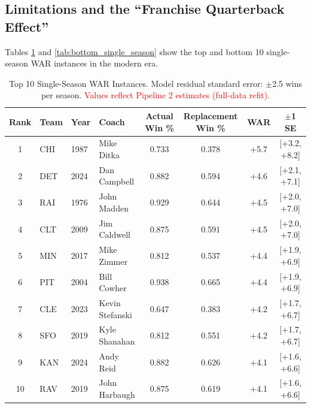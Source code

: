 \documentclass[USenglish]{article}
\newcommand{\rev}[1]{\textcolor{red}{#1}}
\theoremstyle{dgthm}
\theoremstyle{dgdef}
\begin{document}
\subsection{Limitations and the ``Franchise Quarterback Effect''}\label{sec:limitations}

Tables \ref{tab:top_single_season} and \ref{tab:bottom_single_season} show the top and bottom 10 single-season WAR instances in the modern era.

\begin{table}[!ht]
\caption{Top 10 Single-Season WAR Instances. Model residual standard error: $\pm$2.5 wins per season. \rev{Values reflect Pipeline 2 estimates (full-data refit).}}
\label{tab:top_single_season}
\small
\begin{tabular}{clllcccc}
\toprule
Rank & Team & Year & Coach & Actual Win \% & Replacement Win \% & WAR & $\pm$1 SE \\
\midrule
1 & CHI & 1987 & Mike Ditka & 0.733 & 0.378 & +5.7 & [+3.2, +8.2] \\
2 & DET & 2024 & Dan Campbell & 0.882 & 0.594 & +4.6 & [+2.1, +7.1] \\
3 & RAI & 1976 & John Madden & 0.929 & 0.644 & +4.5 & [+2.0, +7.0] \\
4 & CLT & 2009 & Jim Caldwell & 0.875 & 0.591 & +4.5 & [+2.0, +7.0] \\
5 & MIN & 2017 & Mike Zimmer & 0.812 & 0.537 & +4.4 & [+1.9, +6.9] \\
6 & PIT & 2004 & Bill Cowher & 0.938 & 0.665 & +4.4 & [+1.9, +6.9] \\
7 & CLE & 2023 & Kevin Stefanski & 0.647 & 0.383 & +4.2 & [+1.7, +6.7] \\
8 & SFO & 2019 & Kyle Shanahan & 0.812 & 0.551 & +4.2 & [+1.7, +6.7] \\
9 & KAN & 2024 & Andy Reid & 0.882 & 0.626 & +4.1 & [+1.6, +6.6] \\
10 & RAV & 2019 & John Harbaugh & 0.875 & 0.619 & +4.1 & [+1.6, +6.6] \\
\bottomrule
\end{tabular}
\end{table}
\end{document}
